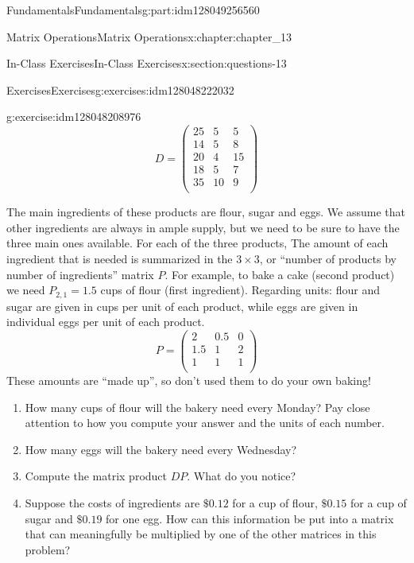 \documentclass[oneside,10pt,]{book}
\numberwithin{equation}{section}
\begin{document}
\begin{partptx}{Fundamentals}{}{Fundamentals}{}{}{g:part:idm128049256560}
\begin{chapterptx}{Matrix Operations}{}{Matrix Operations}{}{}{x:chapter:chapter_13}
\begin{sectionptx}{In-Class Exercises}{}{In-Class Exercises}{}{}{x:section:questions-13}
\begin{exercises-subsection}{Exercises}{}{Exercises}{}{}{g:exercises:idm128048222032}
\begin{exercisegroup}
\begin{divisionexerciseeg}{4}{}{}{g:exercise:idm128048208976}
\begin{equation*}
D =\left(
\begin{array}{ccc}
25 & 5 & 5 \\
14 & 5 & 8 \\
20 & 4 & 15 \\
18 & 5 & 7 \\
35 & 10 & 9 \\
\end{array}
\right)
\end{equation*}
%
\par
The main ingredients of these products are flour, sugar and eggs. We assume that other ingredients are always in ample supply, but we need to be sure to have the three main ones available.   For each of the three products, The amount of each ingredient that is needed is summarized in the \(3 \times 3\), or ``number of products by number of ingredients'' matrix \(P\).  For example, to bake a cake (second product) we need \(P_{2,1}=1.5\) cups of flour (first ingredient).  Regarding units: flour and sugar are given in cups per unit of each product, while eggs are given in individual eggs per unit of each product.%
\begin{equation*}
P =\left(
\begin{array}{ccc}
2 & 0.5 & 0 \\
1.5 & 1 & 2 \\
1 & 1 & 1  \\
\end{array}
\right)
\end{equation*}
These amounts are ``made up'', so don't used them to do your own baking!%
\par
%
\begin{enumerate}[label=(\alph*)]
\item{}How many cups of flour will the bakery need every Monday?  Pay close attention to how you compute your answer and the units of each number.%
\item{}How many eggs will the bakery need every Wednesday?%
\item{}Compute the matrix product \(D P\).   What do you notice?%
\item{}Suppose the costs of ingredients are \(\$0.12\) for a cup of flour, \(\$0.15\) for a cup of sugar and \(\$0.19\) for one egg. How can this information be put into a matrix that can meaningfully be multiplied by one of the other matrices in this problem?%
\end{enumerate}
%
\end{divisionexerciseeg}%

\end{exercisegroup}
\end{exercises-subsection}
\end{sectionptx}
\end{chapterptx}
\end{partptx}
\end{document}
